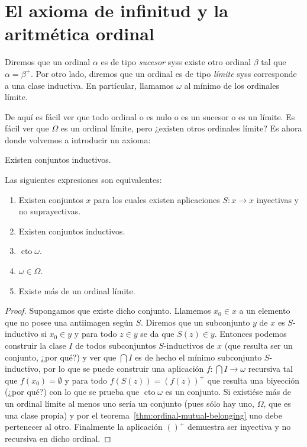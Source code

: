 \documentclass[11pt,a4paper]{book}
\DeclareMathOperator{\cto}{cto}
\begin{document}
\section{El axioma de infinitud y la aritmética ordinal}
\begin{mydef}
	Diremos que un ordinal $\alpha$ es de tipo \textit{sucesor} syss existe otro ordinal $\beta$ tal que $\alpha=\beta^+$. Por otro lado, diremos que un ordinal es de tipo \textit{límite} syss corresponde a una clase inductiva. En partícular, llamamos $\omega$ al mínimo de los ordinales límite.
\end{mydef}
De aquí es fácil ver que todo ordinal o es nulo o es un sucesor o es un límite. Es fácil ver que $\Omega$ es un ordinal límite, pero ¿existen otros ordinales límite? Es ahora donde volvemos a introducir un axioma:
\begin{axiom}
	Existen conjuntos inductivos.
\end{axiom}
\begin{thm}
	Las siguientes expresiones son equivalentes:
	\begin{enumerate}
		\item Existen conjuntos $x$ para los cuales existen aplicaciones $S:x\rightarrow x$ inyectivas y no suprayectivas.
		\item Existen conjuntos inductivos.
		\item $\cto\omega$.
		\item $\omega\in\Omega$.
		\item Existe más de un ordinal límite.
	\end{enumerate}
\end{thm}
\begin{proof}
	Supongamos que existe dicho conjunto. Llamemos $x_0\in x$ a un elemento que no posee una antiimagen según $S$. Diremos que un subconjunto $y$ de $x$ es $S$-inductivo si $x_0\in y$ y para todo $z\in y$ se da que $S(z)\in y$. Entonces podemos construir la clase $I$ de todos subconjuntos $S$-inductivos de $x$ (que resulta ser un conjunto, ¿por qué?) y ver que $\bigcap I$ es de hecho el mínimo subconjunto $S$-inductivo, por lo que se puede construir una aplicación $f:\bigcap I\rightarrow\omega$ recursiva tal que $f(x_0)=\emptyset$ y para todo $f(S(z))=(f(z))^+$ que resulta una biyección (¿por qué?) con lo que se prueba que $\cto\omega$ es un conjunto. Si existiése más de un ordinal límite al menos uno sería un conjunto (pues sólo hay uno, $\Omega$, que es una clase propia) y por el teorema~\ref{thm:ordinal-mutual-belonging} uno debe pertenecer al otro. Finalmente la aplicación $()^+$ demuestra ser inyectiva y no recursiva en dicho ordinal.
\end{proof}
\end{document}
